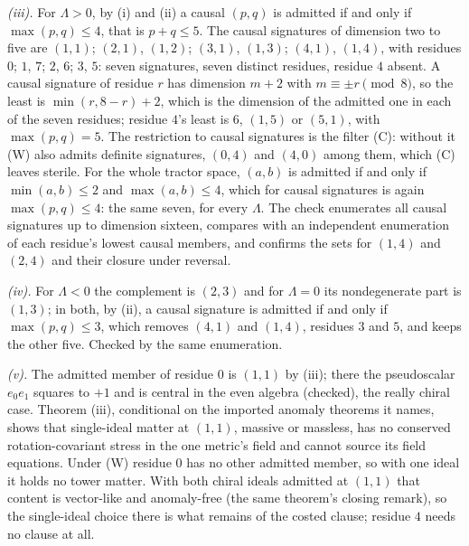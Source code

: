 \emph{(iii).} For $\Lambda > 0$, by (i) and (ii) a causal $(p,q)$ is admitted if and only if $\max(p,q) \le 4$, that is $p + q \le 5$. The causal signatures of dimension two to five are $(1,1)$; $(2,1)$, $(1,2)$; $(3,1)$, $(1,3)$; $(4,1)$, $(1,4)$, with residues $0$; $1$, $7$; $2$, $6$; $3$, $5$: seven signatures, seven distinct residues, residue $4$ absent. A causal signature of residue $r$ has dimension $m + 2$ with $m \equiv \pm r \pmod 8$, so the least is $\min(r, 8-r) + 2$, which is the dimension of the admitted one in each of the seven residues; residue $4$'s least is $6$, $(1,5)$ or $(5,1)$, with $\max(p,q) = 5$. The restriction to causal signatures is the filter (C): without it (W) also admits definite signatures, $(0,4)$ and $(4,0)$ among them, which (C) leaves sterile. For the whole tractor space, $(a,b)$ is admitted if and only if $\min(a,b) \le 2$ and $\max(a,b) \le 4$, which for causal signatures is again $\max(p,q) \le 4$: the same seven, for every $\Lambda$. The check enumerates all causal signatures up to dimension sixteen, compares with an independent enumeration of each residue's lowest causal members, and confirms the sets for $(1,4)$ and $(2,4)$ and their closure under reversal.

\emph{(iv).} For $\Lambda < 0$ the complement is $(2,3)$ and for $\Lambda = 0$ its nondegenerate part is $(1,3)$; in both, by (ii), a causal signature is admitted if and only if $\max(p,q) \le 3$, which removes $(4,1)$ and $(1,4)$, residues $3$ and $5$, and keeps the other five. Checked by the same enumeration.

\emph{(v).} The admitted member of residue $0$ is $(1,1)$ by (iii); there the pseudoscalar $e_{0}e_{1}$ squares to $+1$ and is central in the even algebra (checked), the really chiral case. Theorem (iii), conditional on the imported anomaly theorems it names, shows that single-ideal matter at $(1,1)$, massive or massless, has no conserved rotation-covariant stress in the one metric's field and cannot source its field equations. Under (W) residue $0$ has no other admitted member, so with one ideal it holds no tower matter. With both chiral ideals admitted at $(1,1)$ that content is vector-like and anomaly-free (the same theorem's closing remark), so the single-ideal choice there is what remains of the costed clause; residue $4$ needs no clause at all.

